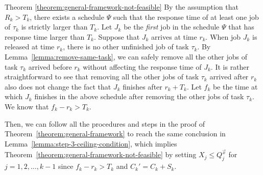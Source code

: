 \begin{appProof}{Theorem \ref{theorem:general-framework-not-feasible}}
  By the assumption that $R_k > T_k$, there exists a schedule $\Psi$
  such that the response time of at least one job of $\tau_k$ is strictly larger than
  $T_k$. Let $J_k$ be the \emph{first} job in the schedule $\Psi$ that has
  response time larger than $T_k$. Suppose that $J_{k}$ arrives at
  time $r_k$. When job $J_k$ is released at time $r_k$, there is no
  other unfinished job of task $\tau_k$. By
  Lemma~\ref{lemma:remove-same-task}, we can safely remove all the
  other jobs of task $\tau_k$ arrived before $r_k$ without affecting
  the response time of $J_k$. It is rather straightforward to see that
  removing all the other jobs of task $\tau_k$ arrived after $r_k$
  also does not change the fact that $J_k$ finishes after
  $r_k+T_k$. Let $f_k$ be the time at which $J_k$ finishes in the
  above schedule after removing the other jobs of task $\tau_k$. We
  know that $f_k - r_k > T_k$.

  Then, we can follow all the procedures and steps in the proof of
  Theorem~\ref{theorem:general-framework} to reach the same conclusion
  in Lemma~\ref{lemma:step-3-ceiling-condition}, which implies
  Theorem~\ref{theorem:general-framework-not-feasible} by setting $X_j
  \leq Q_j^{\vec{x}}$ for $j=1,2,\ldots,k-1$ since $f_k-r_k > T_k$ and
  $C_k'=C_k+S_k$.
\end{appProof}




